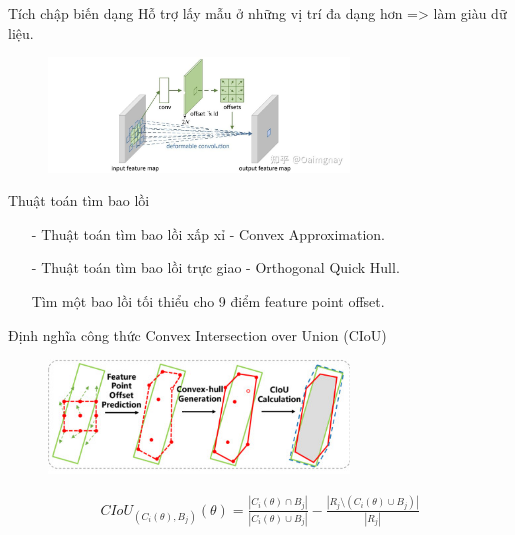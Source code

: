 \documentclass[11pt]{beamer}
\theoremstyle{definition}
\theoremstyle{plain}
\theoremstyle{plain}
\theoremstyle{remark}
\begin{document}
	\begin{frame}{Tích chập biến dạng}
		Hỗ trợ lấy mẫu ở những vị trí đa dạng hơn => làm giàu dữ liệu.
		
		\begin{figure}[ht!]
			\begin{center}
				\includegraphics[width=8cm]{./Hinh_6.jpg}
			\end{center}
		\end{figure}
		
	\end{frame}
	
	
	\begin{frame}{Thuật toán tìm bao lồi}
	
		\begin{itemize}
			\item[-] Thuật toán tìm bao lồi xấp xỉ -  Convex Approximation.
			\item[-]  Thuật toán tìm bao lồi trực giao - Orthogonal Quick Hull.
			
			Tìm một bao lồi tối thiểu cho 9 điểm feature point offset.
			
		\end{itemize}
	\end{frame}
	
	\begin{frame}{Định nghĩa công thức Convex Intersection over Union (CIoU)}
		\begin{figure}[ht!]
			\begin{center}
				\includegraphics[width=8cm]{./feature_point_offset_prediction.jpg}
			\end{center}
		\end{figure}
		\begin{align} 
			CIoU_{(C_i (\theta), B_j)} (\theta) = \frac{|C_i(\theta) \cap B_j|}{|C_i(\theta) \cup B_j|} - \frac{|R_j \setminus (C_i(\theta) \cup B_j)|}{|R_j|}
		\end{align}
	\end{frame}
	
\end{document}
